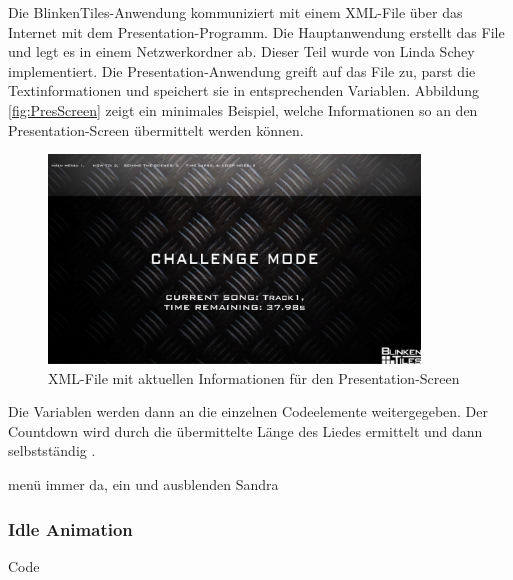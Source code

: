 Die BlinkenTiles-Anwendung kommuniziert mit einem XML-File über das Internet mit dem Presentation-Programm. Die Hauptanwendung erstellt das File und legt es in einem Netzwerkordner ab. Dieser Teil wurde von Linda Schey implementiert. Die Presentation-Anwendung greift auf das File zu, parst die Textinformationen und speichert sie in entsprechenden Variablen. Abbildung \autoref{fig:PresScreen} zeigt ein minimales Beispiel, welche Informationen so an den Presentation-Screen übermittelt werden können.

\begin{figure}[htbp]
	\centering
		\includegraphics[width=0.88\textwidth]{images/PresScreen.png}
	\caption{XML-File mit aktuellen Informationen für den Presentation-Screen }
	\label{fig:PresScreen}
\end{figure}

Die Variablen werden dann an die einzelnen Codeelemente weitergegeben. Der Countdown wird durch die übermittelte Länge des Liedes ermittelt und dann selbstständig . 

menü immer da, ein und ausblenden
Sandra

\subsubsection{Idle Animation}

Code